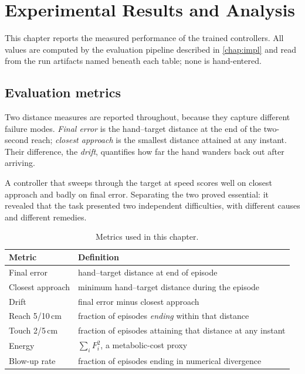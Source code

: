 
\chapter{Experimental Results and Analysis}
\label{ch:results}

This chapter reports the measured performance of the trained controllers. All
values are computed by the evaluation pipeline described in
\cref{chap:impl} and read from the run artifacts named beneath each table;
none is hand-entered.

\section{Evaluation metrics}

Two distance measures are reported throughout, because they capture different
failure modes. \emph{Final error} is the hand--target distance at the end of the
two-second reach; \emph{closest approach} is the smallest distance attained at
any instant. Their difference, the \emph{drift}, quantifies how far the hand
wanders back out after arriving.

A controller that sweeps through the target at speed scores well on closest
approach and badly on final error. Separating the two proved essential: it
revealed that the task presented two independent difficulties, with different
causes and different remedies.

\begin{table}[H]
\centering
\caption{Metrics used in this chapter.}
\begin{tabular}{@{} L{4.0cm} L{9.0cm} @{}}
\toprule
\textbf{Metric} & \textbf{Definition} \\
\midrule
Final error & hand--target distance at end of episode \\
Closest approach & minimum hand--target distance during the episode \\
Drift & final error minus closest approach \\
Reach 5/10\,cm & fraction of episodes \emph{ending} within that distance \\
Touch 2/5\,cm & fraction of episodes attaining that distance at any instant \\
Energy & $\sum_i F_i^2$, a metabolic-cost proxy \\
Blow-up rate & fraction of episodes ending in numerical divergence \\
\bottomrule
\end{tabular}
\label{tab:metrics}
\end{table}

